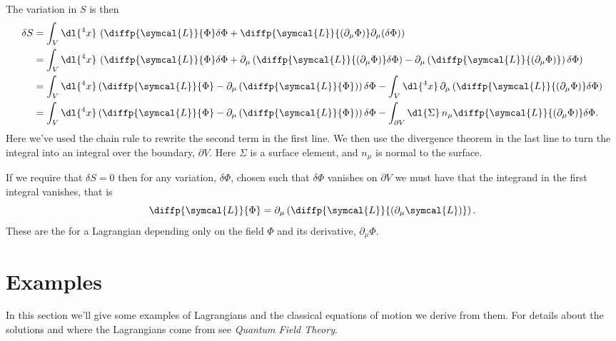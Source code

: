 \documentclass[fleqn]{NotesClass}
\newcommand{\course}[1]{\textit{#1}}
\newcommand{\lagrangianDensity}{\symcal{L}}
\begin{document}
    The variation in \(S\) is then
    \begin{align}
        \delta S &= \int_V \dl{^4x} \, \left( \diffp{\lagrangianDensity}{\Phi} \delta \Phi + \diffp{\lagrangianDensity}{(\partial_\mu \Phi)} \partial_\mu(\delta \Phi) \right)\\
        &= \int_V \dl{^4x} \, \left( \diffp{\lagrangianDensity}{\Phi} \delta \Phi + \partial_\mu\left( \diffp{\lagrangianDensity}{(\partial_\mu \Phi)} \delta \Phi \right) - \partial_\mu\left( \diffp{\lagrangianDensity}{(\partial_\mu \Phi)} \right) \delta \Phi \right)\\
        &= \int_V \dl{^4x} \left( \diffp{\lagrangianDensity}{\Phi} - \partial_\mu \left( \diffp{\lagrangianDensity}{\Phi} \right) \right) \delta\Phi - \int_V \dl{^4x} \, \partial_\mu \left( \diffp{\lagrangianDensity}{(\partial_\mu \Phi)} \delta \Phi \right)\\
        &= \int_V \dl{^4x} \left( \diffp{\lagrangianDensity}{\Phi} - \partial_\mu \left( \diffp{\lagrangianDensity}{\Phi} \right) \right) \delta\Phi - \int_{\partial V} \dl{\Sigma} \, n_\mu \diffp{\lagrangianDensity}{(\partial_\mu \Phi)} \delta\Phi.
    \end{align}
    Here we've used the chain rule to rewrite the second term in the first line.
    We then use the divergence theorem in the last line to turn the integral into an integral over the boundary, \(\partial V\).
    Here \(\Sigma\) is a surface element, and \(n_\mu\) is normal to the surface.
    
    If we require that \(\delta S = 0\) then for any variation, \(\delta\Phi\), chosen such that \(\delta\Phi\) vanishes on \(\partial V\) we must have that the integrand in the first integral vanishes, that is
    \begin{equation}
        \diffp{\lagrangianDensity}{\Phi} = \partial_\mu \left( \diffp{\lagrangianDensity}{(\partial_\mu\lagrangianDensity)} \right).
    \end{equation}
    These are the  for a Lagrangian depending only on the field \(\Phi\) and its derivative, \(\partial_\mu \Phi\).
    
    \section{Examples}
    In this section we'll give some examples of Lagrangians and the classical equations of motion we derive from them.
    For details about the solutions and where the Lagrangians come from see \course{Quantum Field Theory}.
    
\end{document}
